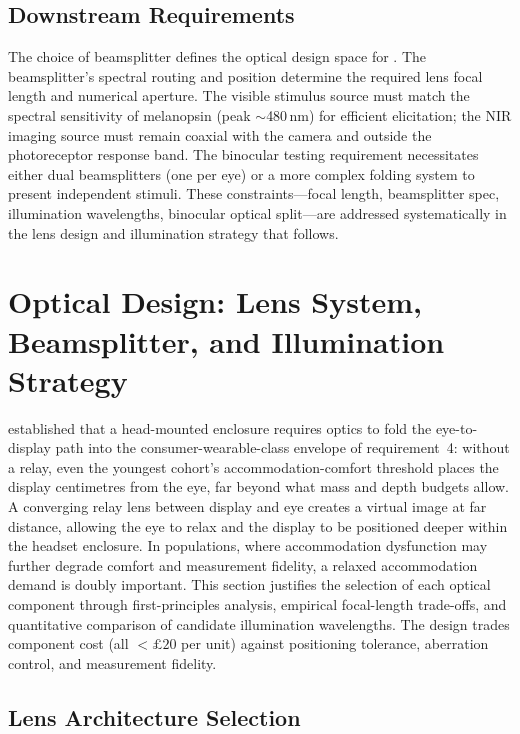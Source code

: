 \subsection{Downstream Requirements}
\label{sec:hw-downstream-requirements}

The choice of beamsplitter defines the optical design space for . The beamsplitter's spectral routing and position determine the required lens focal length and numerical aperture. The visible stimulus source must match the spectral sensitivity of melanopsin (peak $\sim$480\,nm) for efficient  elicitation; the NIR imaging source must remain coaxial with the camera and outside the photoreceptor response band. The binocular testing requirement necessitates either dual beamsplitters (one per eye) or a more complex folding system to present independent stimuli. These constraints---focal length, beamsplitter spec, illumination wavelengths, binocular optical split---are addressed systematically in the lens design and illumination strategy that follows.


\section{Optical Design: Lens System, Beamsplitter, and Illumination Strategy}
\label{sec:hw-optical-design}

 established that a head-mounted enclosure requires optics to fold the eye-to-display path into the consumer-wearable-class envelope of requirement~4: without a relay, even the youngest cohort's accommodation-comfort threshold places the display centimetres from the eye, far beyond what mass and depth budgets allow. A converging relay lens between display and eye creates a virtual image at far distance, allowing the eye to relax and the display to be positioned deeper within the headset enclosure. In  populations, where accommodation dysfunction may further degrade comfort and measurement fidelity, a relaxed accommodation demand is doubly important. This section justifies the selection of each optical component through first-principles analysis, empirical focal-length trade-offs, and quantitative comparison of candidate illumination wavelengths. The design trades component cost (all $<\pounds 20$ per unit) against positioning tolerance, aberration control, and measurement fidelity.


\subsection{Lens Architecture Selection}
\label{sec:hw-lens-architecture}

